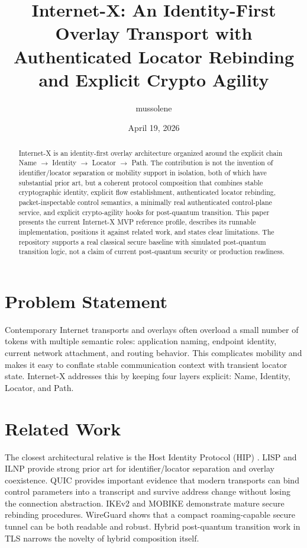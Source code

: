 \documentclass[11pt]{article}
\title{Internet-X: An Identity-First Overlay Transport with Authenticated Locator Rebinding and Explicit Crypto Agility}
\author{mussolene}
\date{April 19, 2026}
\begin{document}
\maketitle

\begin{abstract}
Internet-X is an identity-first overlay architecture organized around the explicit chain Name $\rightarrow$ Identity $\rightarrow$ Locator $\rightarrow$ Path. The contribution is not the invention of identifier/locator separation or mobility support in isolation, both of which have substantial prior art, but a coherent protocol composition that combines stable cryptographic identity, explicit flow establishment, authenticated locator rebinding, packet-inspectable control semantics, a minimally real authenticated control-plane service, and explicit crypto-agility hooks for post-quantum transition. This paper presents the current Internet-X MVP reference profile, describes its runnable implementation, positions it against related work, and states clear limitations. The repository supports a real classical secure baseline with simulated post-quantum transition logic, not a claim of current post-quantum security or production readiness.
\end{abstract}

\section{Problem Statement}
Contemporary Internet transports and overlays often overload a small number of tokens with multiple semantic roles: application naming, endpoint identity, current network attachment, and routing behavior. This complicates mobility and makes it easy to conflate stable communication context with transient locator state. Internet-X addresses this by keeping four layers explicit: Name, Identity, Locator, and Path.

\section{Related Work}
The closest architectural relative is the Host Identity Protocol (HIP) \cite{rfc9063,rfc7401,rfc8046}. LISP \cite{rfc9299,rfc9300} and ILNP \cite{rfc6740} provide strong prior art for identifier/locator separation and overlay coexistence. QUIC \cite{rfc9000,rfc9001} provides important evidence that modern transports can bind control parameters into a transcript and survive address change without losing the connection abstraction. IKEv2 and MOBIKE \cite{rfc7296,rfc4555} demonstrate mature secure rebinding procedures. WireGuard \cite{wireguard} shows that a compact roaming-capable secure tunnel can be both readable and robust. Hybrid post-quantum transition work in TLS \cite{hybridtls} narrows the novelty of hybrid composition itself.
\end{document}
